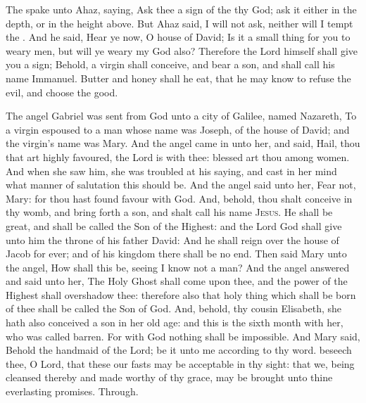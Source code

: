 \vspace{-1ex}

 The  spake unto Ahaz, saying, Ask thee a sign of the  thy God; ask it either in the depth, or in the height above. But Ahaz said, I will not ask, neither will I tempt the . And he said, Hear ye now, O house of David; Is it a small thing for you to weary men, but will ye weary my God also? Therefore the Lord himself shall give you a sign; Behold, a virgin shall conceive, and bear a son, and shall call his name Immanuel. Butter and honey shall he eat, that he may know to refuse the evil, and choose the good.

 The angel Gabriel was sent from God unto a city of Galilee, named Nazareth, To a virgin espoused to a man whose name was Joseph, of the house of David; and the virgin's name was Mary. And the angel came in unto her, and said, Hail, thou that art highly favoured, the Lord is with thee: blessed art thou among women. And when she saw him, she was troubled at his saying, and cast in her mind what manner of salutation this should be. And the angel said unto her, Fear not, Mary: for thou hast found favour with God. And, behold, thou shalt conceive in thy womb, and bring forth a son, and shalt call his name \textsc{Jesus}. He shall be great, and shall be called the Son of the Highest: and the Lord God shall give unto him the throne of his father David: And he shall reign over the house of Jacob for ever; and of his kingdom there shall be no end. Then said Mary unto the angel, How shall this be, seeing I know not a man? And the angel answered and said unto her, The Holy Ghost shall come upon thee, and the power of the Highest shall overshadow thee: therefore also that holy thing which shall be born of thee shall be called the Son of God. And, behold, thy cousin Elisabeth, she hath also conceived a son in her old age: and this is the sixth month with her, who was called barren. For with God nothing shall be impossible. And Mary said, Behold the handmaid of the Lord; be it unto me according to thy word.
\secret
{} beseech thee, O Lord, that these our fasts may be acceptable in thy sight: that we, being cleansed thereby and made worthy of thy grace, may be brought unto thine everlasting promises. Through.
